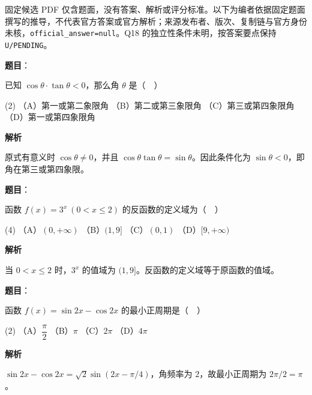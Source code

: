 

\begin{gktip}
固定候选 PDF 仅含题面，没有答案、解析或评分标准。以下为编者依据固定题面撰写的推导，不代表官方答案或官方解析；来源发布者、版次、复制链与官方身份未核，\texttt{official_answer=null}。Q18 的独立性条件未明，按答案要点保持 \texttt{U/PENDING}。
\end{gktip}


\begin{answer}

\textbf{题目}：

已知 $\cos\theta\cdot\tan\theta<0$，那么角 $\theta$ 是（　）

\begin{gkopts}(2)
\task （A）第一或第二象限角
\task （B）第二或第三象限角
\task （C）第三或第四象限角
\task （D）第一或第四象限角
\end{gkopts}

\textbf{解析}

原式有意义时 $\cos\theta\ne0$，并且 $\cos\theta\tan\theta=\sin\theta$。因此条件化为 $\sin\theta<0$，即角在第三或第四象限。


\end{answer}
\begin{answer}

\textbf{题目}：

函数 $f(x)=3^x\ (0<x\leq 2)$ 的反函数的定义域为（　）

\begin{gkopts}(4)
\task （A）$(0,+\infty)$
\task （B）$(1,9]$
\task （C）$(0,1)$
\task （D）$[9,+\infty)$
\end{gkopts}

\textbf{解析}

当 $0<x\leq2$ 时，$3^x$ 的值域为 $(1,9]$。反函数的定义域等于原函数的值域。

\gkanswer{答案：B，$(1,9]$}

\end{answer}
\begin{answer}

\textbf{题目}：

函数 $f(x)=\sin 2x-\cos 2x$ 的最小正周期是（　）

\begin{gkopts}(2)
\task （A）$\dfrac{\pi}{2}$
\task （B）$\pi$
\task （C）$2\pi$
\task （D）$4\pi$
\end{gkopts}

\textbf{解析}

$\sin2x-\cos2x=\sqrt2\sin(2x-\pi/4)$，角频率为 $2$，故最小正周期为 $2\pi/2=\pi$。


\end{answer}
